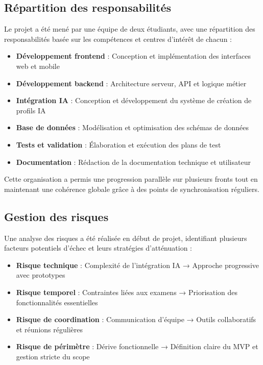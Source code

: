 \subsection{Répartition des responsabilités}

Le projet a été mené par une équipe de deux étudiants, avec une répartition des responsabilités basée sur les compétences et centres d'intérêt de chacun :

\begin{itemize}
  \item \textbf{Développement frontend} : Conception et implémentation des interfaces web et mobile
  
  \item \textbf{Développement backend} : Architecture serveur, API et logique métier
  
  \item \textbf{Intégration IA} : Conception et développement du système de création de profils IA
  
  \item \textbf{Base de données} : Modélisation et optimisation des schémas de données
  
  \item \textbf{Tests et validation} : Élaboration et exécution des plans de test
  
  \item \textbf{Documentation} : Rédaction de la documentation technique et utilisateur
\end{itemize}

Cette organisation a permis une progression parallèle sur plusieurs fronts tout en maintenant une cohérence globale grâce à des points de synchronisation réguliers.

\subsection{Gestion des risques}

Une analyse des risques a été réalisée en début de projet, identifiant plusieurs facteurs potentiels d'échec et leurs stratégies d'atténuation :

\begin{itemize}
  \item \textbf{Risque technique} : Complexité de l'intégration IA → Approche progressive avec prototypes
  
  \item \textbf{Risque temporel} : Contraintes liées aux examens → Priorisation des fonctionnalités essentielles
  
  \item \textbf{Risque de coordination} : Communication d'équipe → Outils collaboratifs et réunions régulières
  
  \item \textbf{Risque de périmètre} : Dérive fonctionnelle → Définition claire du MVP et gestion stricte du scope
\end{itemize}

